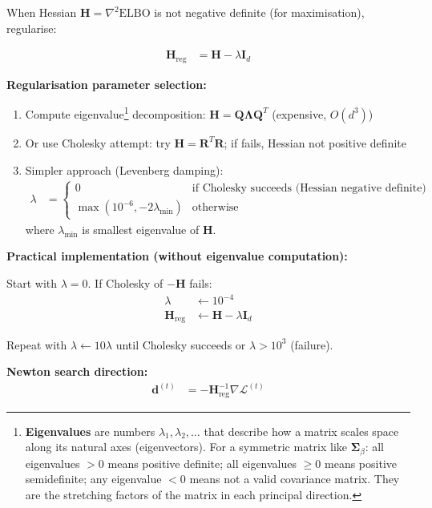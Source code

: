 \documentclass[11pt]{article}
\newcommand{\ELBO}{\text{ELBO}}
\begin{document}
When Hessian $\bm{H} = \nabla^2 \ELBO$ is not negative definite (for maximisation), regularise:

\begin{align}
\bm{H}_{\text{reg}} &= \bm{H} - \lambda \bm{I}_d
\end{align}

\textbf{Regularisation parameter selection:}

\begin{enumerate}
\item Compute eigenvalue\footnote{\textbf{Eigenvalues} are numbers $\lambda_1, \lambda_2, \ldots$ that describe how a matrix scales space along its natural axes (eigenvectors). For a symmetric matrix like $\bm{\Sigma}_\beta$: all eigenvalues $> 0$ means positive definite; all eigenvalues $\geq 0$ means positive semidefinite; any eigenvalue $< 0$ means not a valid covariance matrix. They are the stretching factors of the matrix in each principal direction.} decomposition: $\bm{H} = \bm{Q} \bm{\Lambda} \bm{Q}^T$ (expensive, $O(d^3)$)
\item Or use Cholesky attempt: try $\bm{H} = \bm{R}^T \bm{R}$; if fails, Hessian not positive definite
\item Simpler approach (Levenberg damping):
\begin{align}
\lambda &= \begin{cases}
0 & \text{if Cholesky succeeds (Hessian negative definite)}\\
\max(10^{-6}, -2\lambda_{\min}) & \text{otherwise}
\end{cases}
\end{align}
where $\lambda_{\min}$ is smallest eigenvalue of $\bm{H}$.
\end{enumerate}

\textbf{Practical implementation (without eigenvalue computation):}

Start with $\lambda = 0$. If Cholesky of $-\bm{H}$ fails:
\begin{align}
\lambda &\leftarrow 10^{-4}\\
\bm{H}_{\text{reg}} &\leftarrow \bm{H} - \lambda \bm{I}_d
\end{align}

Repeat with $\lambda \leftarrow 10 \lambda$ until Cholesky succeeds or $\lambda > 10^{3}$ (failure).

\textbf{Newton search direction:}
\begin{align}
\bm{d}^{(t)} &= -\bm{H}_{\text{reg}}^{-1} \nabla \mathcal{L}^{(t)}
\end{align}
\end{document}
